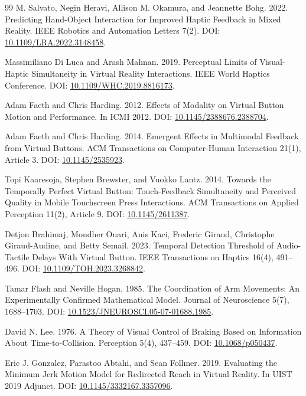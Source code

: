 \documentclass[11pt]{article}
\begin{document}
\begin{thebibliography}{99}
M. Salvato, Negin Heravi, Allison M. Okamura, and Jeannette Bohg. 2022. Predicting Hand-Object Interaction for Improved Haptic Feedback in Mixed Reality. IEEE Robotics and Automation Letters 7(2). DOI: \href{https://doi.org/10.1109/LRA.2022.3148458}{10.1109/LRA.2022.3148458}.

Massimiliano Di Luca and Arash Mahnan. 2019. Perceptual Limits of Visual-Haptic Simultaneity in Virtual Reality Interactions. IEEE World Haptics Conference. DOI: \href{https://doi.org/10.1109/WHC.2019.8816173}{10.1109/WHC.2019.8816173}.

Adam Faeth and Chris Harding. 2012. Effects of Modality on Virtual Button Motion and Performance. In ICMI 2012. DOI: \href{https://doi.org/10.1145/2388676.2388704}{10.1145/2388676.2388704}.

Adam Faeth and Chris Harding. 2014. Emergent Effects in Multimodal Feedback from Virtual Buttons. ACM Transactions on Computer-Human Interaction 21(1), Article 3. DOI: \href{https://doi.org/10.1145/2535923}{10.1145/2535923}.

Topi Kaaresoja, Stephen Brewster, and Vuokko Lantz. 2014. Towards the Temporally Perfect Virtual Button: Touch-Feedback Simultaneity and Perceived Quality in Mobile Touchscreen Press Interactions. ACM Transactions on Applied Perception 11(2), Article 9. DOI: \href{https://doi.org/10.1145/2611387}{10.1145/2611387}.

Detjon Brahimaj, Mondher Ouari, Anis Kaci, Frederic Giraud, Christophe Giraud-Audine, and Betty Semail. 2023. Temporal Detection Threshold of Audio-Tactile Delays With Virtual Button. IEEE Transactions on Haptics 16(4), 491--496. DOI: \href{https://doi.org/10.1109/TOH.2023.3268842}{10.1109/TOH.2023.3268842}.

Tamar Flash and Neville Hogan. 1985. The Coordination of Arm Movements: An Experimentally Confirmed Mathematical Model. Journal of Neuroscience 5(7), 1688--1703. DOI: \href{https://doi.org/10.1523/JNEUROSCI.05-07-01688.1985}{10.1523/JNEUROSCI.05-07-01688.1985}.

David N. Lee. 1976. A Theory of Visual Control of Braking Based on Information About Time-to-Collision. Perception 5(4), 437--459. DOI: \href{https://doi.org/10.1068/p050437}{10.1068/p050437}.

Eric J. Gonzalez, Parastoo Abtahi, and Sean Follmer. 2019. Evaluating the Minimum Jerk Motion Model for Redirected Reach in Virtual Reality. In UIST 2019 Adjunct. DOI: \href{https://doi.org/10.1145/3332167.3357096}{10.1145/3332167.3357096}.


\end{thebibliography}
\end{document}
